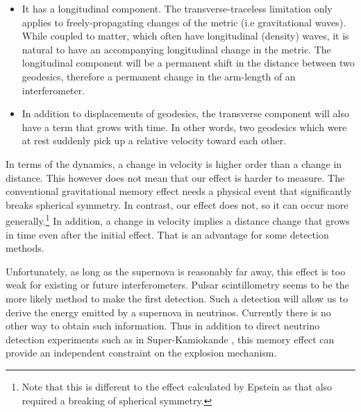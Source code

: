 \documentclass[aps,showpacs,onecolumn,floats,prd,superscriptaddress,nofootinbib]{revtex4-1}
\begin{document}
\begin{itemize}
\item It has a longitudinal component. The transverse-traceless limitation only applies to freely-propagating changes of the metric (i.e gravitational waves). 
While coupled to matter, which often have longitudinal (density) waves, it is natural to have an accompanying longitudinal change in the metric. 
The longitudinal component will be a permanent shift in the distance between two geodesics, therefore a permanent change in the arm-length of an interferometer.
\item In addition to displacements of geodesics, the transverse component will also have a term that grows with time. 
In other words, two geodesics which were at rest suddenly pick up a relative velocity toward each other.
\end{itemize}
In terms of the dynamics, a change in velocity is higher order than a change in distance.
This however does not mean that our effect is harder to measure. 
The conventional gravitational memory effect needs a physical event that significantly breaks spherical symmetry. 
In contrast, our effect does not, so it can occur more generally.\footnote{Note that this is different to the effect calculated by Epstein \cite{Epstein:1978dv} as that also required a breaking of spherical symmetry.}
In addition, a change in velocity implies a distance change that grows in time even after the initial effect. 
That is an advantage for some detection methods.  

Unfortunately, as long as the supernova is reasonably far away, this effect is too weak for existing or future interferometers. 
Pulsar scintillometry seems to be the more likely method to make the first detection. 
Such a detection will allow us to derive the energy emitted by a supernova in neutrinos. 
Currently there is no other way to obtain such information. 
Thus in addition to direct neutrino detection experiments such as in Super-Kamiokande \cite{SuperKSN}, this memory effect can provide an independent constraint on the explosion mechanism.

\end{document}
